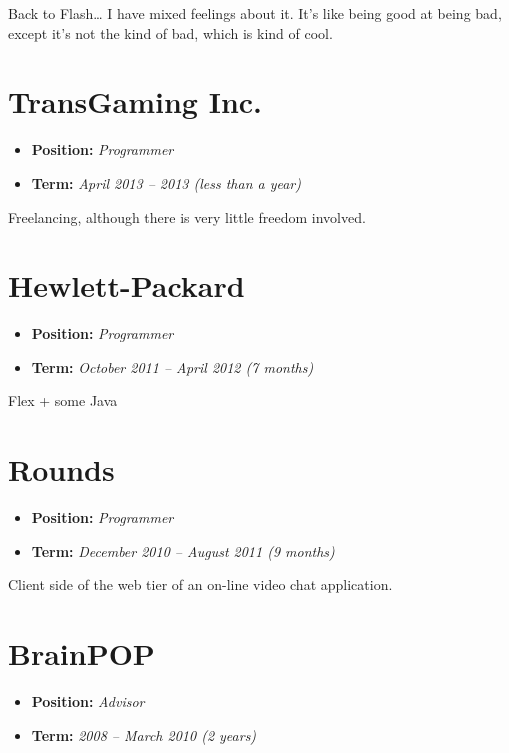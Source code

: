 \documentclass[oneside]{memoir}
\begin{document}
Back to Flash\ldots{} I have mixed feelings about it. It's like being
good at being bad, except it's not the kind of bad, which is kind of
cool.
\section{TransGaming Inc.}
\label{sec-3-2}
\begin{itemize}
\item \textbf{Position:} \emph{Programmer}
\item \textbf{Term:} \emph{April 2013 – 2013 (less than a year)}
\end{itemize}

Freelancing, although there is very little freedom involved.
\section{Hewlett-Packard}
\label{sec-3-3}
\begin{itemize}
\item \textbf{Position:} \emph{Programmer}
\item \textbf{Term:} \emph{October 2011 – April 2012 (7 months)}
\end{itemize}

Flex + some Java
\section{Rounds}
\label{sec-3-4}
\begin{itemize}
\item \textbf{Position:} \emph{Programmer}
\item \textbf{Term:} \emph{December 2010 – August 2011 (9 months)}
\end{itemize}

Client side of the web tier of an on-line video chat application.
\section{BrainPOP}
\label{sec-3-5}
\begin{itemize}
\item \textbf{Position:} \emph{Advisor}
\item \textbf{Term:} \emph{2008 – March 2010 (2 years)}
\end{itemize}
\end{document}
